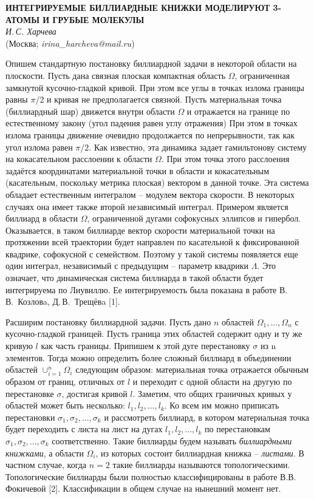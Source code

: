 \begin{center}{ \bf ИНТЕГРИРУЕМЫЕ БИЛЛИАРДНЫЕ КНИЖКИ МОДЕЛИРУЮТ 3-АТОМЫ И ГРУБЫЕ МОЛЕКУЛЫ}\\
{\it И.\,С. Харчева } \\
(Москва; {\it irina\_harcheva@mail.ru})
\end{center}


Опишем стандартную постановку биллиардной задачи в некоторой области на плоскости. Пусть дана связная плоская компактная область $\Omega$, ограниченная замкнутой кусочно-гладкой кривой. При этом все углы в точках излома границы равны $\pi/2$ и кривая не предполагается связной.
Пусть материальная точка (биллиардный шар) движется внутри области $\Omega$ и отражается на границе по естественному закону
(угол падения равен углу отражения) При этом в точках излома границы движение очевидно продолжается по непрерывности, так как угол излома равен $ \pi/2 $.
Как известно, эта динамика задает гамильтонову систему на кокасательном расслоении к области $\Omega$.  При этом точка этого расслоения задаётся координатами материальной точки в области и кокасательным (касательным, поскольку метрика плоская) вектором в данной точке.
Эта система обладает естественным интегралом -- модулем вектора скорости. В некоторых случаях она имеет также
второй независимый интеграл. Примером является биллиард в области $\Omega$, ограниченной дугами софокусных эллипсов и гипербол. Оказывается, в таком биллиарде вектор скорости материальной точки на протяжении всей траектории будет направлен по касательной к фиксированной квадрике, софокусной с семейством. Поэтому у такой системы появляется еще один интеграл, независимый с предыдущим -- параметр квадрики $ \Lambda $. Это означает, что динамическая система биллиарда в такой области будет интегрируема по Лиувиллю. Ее интегрируемость была показана в работе В.\,В.~Козловa, Д.\,В.~Трещёвa [1].

Расширим постановку биллиардной задачи. Пусть дано $n$ областей $\Omega_1, ... ,\Omega_n$ с кусочно-гладкой границей.
Пусть граница этих областей содержит одну и ту же кривую $l$ как часть границы. Припишем к этой дуге перестановку $ \sigma $ из n элементов. Тогда можно определить более сложный биллиард в объединении областей $\cup_{i = 1}^n \Omega_i$ следующим образом: материальная точка отражается обычным образом от границ, отличных от $l$ и переходит с одной области на другую по перестановке $ \sigma $, достигая кривой $l$. Заметим, что общих граничных кривых у областей может быть несколько: $ l_1, l_2, ..., l_k $. Ко всем им можно приписать перестановки $ \sigma_1, \sigma_2, ..., \sigma_k $  и рассмотреть биллиард, в котором материальная точка будет переходить с листа на лист на дугах $ l_1, l_2, ..., l_k $ по перестановкам $ \sigma_1, \sigma_2, ..., \sigma_k $ соответственно. Такие биллиарды будем называть \textit{биллиардными книжками}, а области $ \Omega_i $,  из которых состоит биллиардная книжка -- \textit{листами}. В частном случае, когда $ n = 2 $ такие биллиарды называются топологическими. Топологические биллиарды были полностью классифицированы в работе В.В.\,Фокичевой [2]. Классификации в общем случае на нынешний момент нет.

